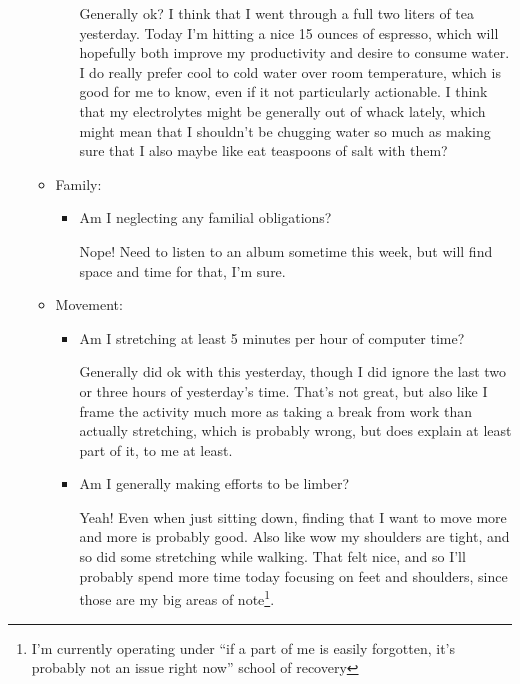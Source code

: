 \documentclass[12pt]{article}
\newcommand{\say}[1]{``#1''}
\renewcommand{\,}{\textsuperscript{,}}
\begin{document}
\begin{enumerate}
\begin{itemize}
\begin{itemize}
Generally ok?  
I think that I went through a full two liters of tea yesterday. Today I'm hitting a nice 15 ounces of espresso, which will hopefully both improve my productivity and desire to consume water.  
I do really prefer cool to cold water over room temperature, which is good for me to know, even if it not particularly actionable.  
I think that my electrolytes might be generally out of whack lately, which might mean that I shouldn't be chugging water so much as making sure that I also maybe like eat teaspoons of salt with them?

\end{itemize}

\item Family:

\begin{itemize}

\item Am I neglecting any familial obligations?

Nope! Need to listen to an album sometime this week, but will find space and time for that, I'm sure.

\end{itemize}

\item Movement:

\begin{itemize}

\item Am I stretching at least 5 minutes per hour of computer time?

Generally did ok with this yesterday, though I did ignore the last two or three hours of yesterday's time.  
That's not great, but also like I frame the activity much more as taking a break from work than actually stretching, which is probably wrong, but does explain at least part of it, to me at least.

\item Am I generally making efforts to be limber?

Yeah! Even when just sitting down, finding that I want to move more and more is probably good.  
Also like wow my shoulders are tight, and so did some stretching while walking. That felt nice, and so I'll probably spend more time today focusing on feet and shoulders, since those are my big areas of note\footnote{I'm currently operating under \say{if a part of me is easily forgotten, it's probably not an issue right now} school of recovery}.

\end{itemize}


\end{itemize}
\end{enumerate}
\end{document}
